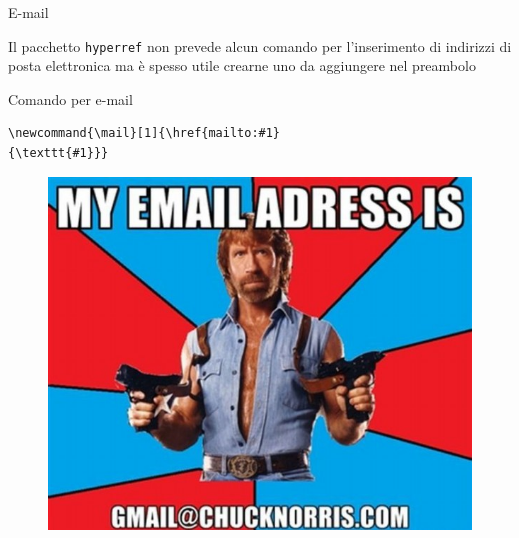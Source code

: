 \begin{frame}[fragile]{E-mail}

Il pacchetto \texttt{hyperref} non prevede alcun comando per l'inserimento di
indirizzi di posta elettronica ma è spesso utile crearne uno da aggiungere nel
preambolo

\begin{newcommandblock}{Comando per e-mail}
	\begin{lstlisting}
\newcommand{\mail}[1]{\href{mailto:#1}
{\texttt{#1}}}
	\end{lstlisting}
\end{newcommandblock}

\begin{figure}
	\hspace*{-7cm} 
	\includegraphics[scale=0.25]{res/images/email}
\end{figure}

\end{frame}